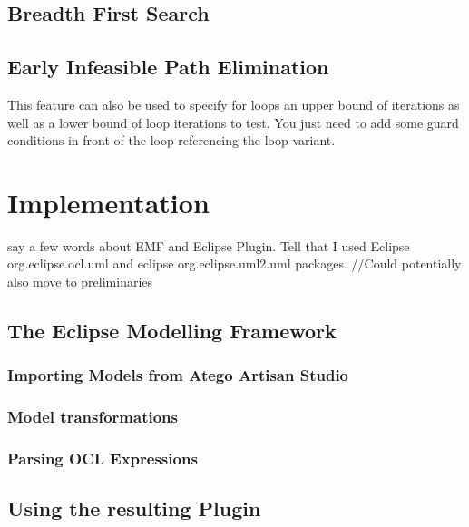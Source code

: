 \subsection{Breadth First Search}
\subsection{Early Infeasible Path Elimination}
This feature can also be used to specify for loops an upper bound of iterations as well as a lower bound of loop iterations to test. You just need to add some guard conditions in front of the loop referencing the loop variant.
\section{Implementation}
say a few words about EMF and Eclipse Plugin. Tell that I used Eclipse org.eclipse.ocl.uml and eclipse org.eclipse.uml2.uml packages. //Could potentially also move to preliminaries
\subsection{The Eclipse Modelling Framework}
\cite{EMF}
\subsubsection{Importing Models from Atego Artisan Studio}
\subsubsection{Model transformations}
\subsubsection{Parsing OCL Expressions}
\subsection{Using the resulting Plugin}
